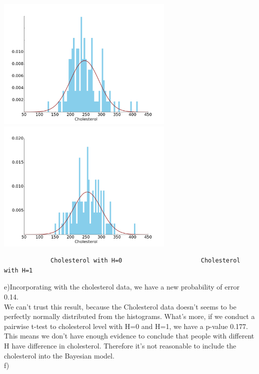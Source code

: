 \documentclass[11pt]{article}
\begin{document}
 \includegraphics[height =2.5in]{245}
  \includegraphics[height =2.5in]{254}
  \begin{verbatim}
             Cholesterol with H=0                      Cholesterol with H=1
  \end{verbatim}

e)Incorporating with the cholesterol data, we have a new probability of error 0.14. \\

We can't trust this result, because the Cholesterol data doesn't seems to be perfectly normally distributed from the histograms. What's more, if we conduct a pairwise t-test to cholesterol level with H=0 and H=1, we have a p-value 0.177. This means we don't have enough evidence to conclude that  people with different H have difference in cholesterol. Therefore it's not reasonable to include the cholesterol into the Bayesian model.  \\

f) 
\end{document}
